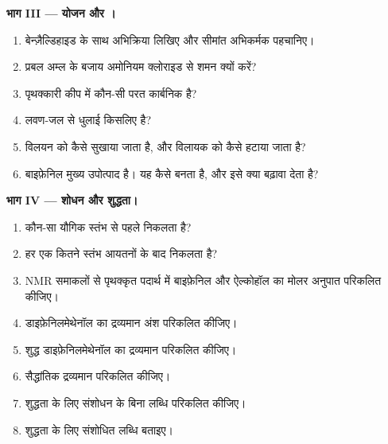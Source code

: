 \begin{problem}
\medskip
\noindent\textbf{भाग III --- योजन और ।}
\begin{enumerate}[resume]
  \item बेन्ज़ैल्डिहाइड के साथ अभिक्रिया लिखिए और सीमांत अभिकर्मक पहचानिए।
  \item प्रबल अम्ल के बजाय अमोनियम क्लोराइड से शमन क्यों करें?
  \item पृथक्कारी कीप में कौन-सी परत कार्बनिक है?
  \item लवण-जल से धुलाई किसलिए है?
  \item विलयन को कैसे सुखाया जाता है, और विलायक को कैसे हटाया जाता है?
  \item बाइफ़ेनिल मुख्य उपोत्पाद है। यह कैसे बनता है, और इसे क्या बढ़ावा देता है?
\end{enumerate}

\medskip
\noindent\textbf{भाग IV --- शोधन और शुद्धता।}
\begin{enumerate}[resume]
  \item कौन-सा यौगिक स्तंभ से पहले निकलता है?
  \item हर एक कितने स्तंभ आयतनों के बाद निकलता है?
  \item NMR समाकलों से पृथक्कृत पदार्थ में बाइफ़ेनिल और ऐल्कोहॉल का मोलर अनुपात
        परिकलित कीजिए।
  \item डाइफ़ेनिलमेथेनॉल का द्रव्यमान अंश परिकलित कीजिए।
  \item शुद्ध डाइफ़ेनिलमेथेनॉल का द्रव्यमान परिकलित कीजिए।
  \item सैद्धांतिक द्रव्यमान परिकलित कीजिए।
  \item शुद्धता के लिए संशोधन के बिना लब्धि परिकलित कीजिए।
  \item शुद्धता के लिए संशोधित लब्धि बताइए।
\end{enumerate}
\end{problem}
